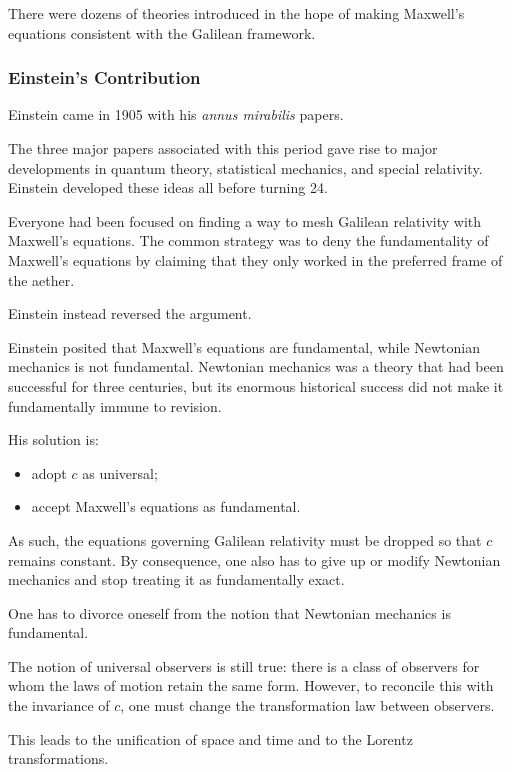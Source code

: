 		There were dozens of theories introduced in the hope of making Maxwell's equations consistent with the Galilean framework.

	\subsubsection{Einstein's Contribution}

		Einstein came in 1905 with his \textit{annus mirabilis} papers.

		The three major papers associated with this period gave rise to major developments in quantum theory, statistical mechanics, and special relativity. Einstein developed these ideas all before turning 24.

		Everyone had been focused on finding a way to mesh Galilean relativity with Maxwell's equations. The common strategy was to deny the fundamentality of Maxwell's equations by claiming that they only worked in the preferred frame of the aether.

		Einstein instead reversed the argument.

		Einstein posited that Maxwell's equations are fundamental, while Newtonian mechanics is not fundamental. Newtonian mechanics was a theory that had been successful for three centuries, but its enormous historical success did not make it fundamentally immune to revision.

		His solution is:

		\begin{itemize}
			\item adopt $c$ as universal;
			\item accept Maxwell's equations as fundamental.
		\end{itemize}

		As such, the equations governing Galilean relativity must be dropped so that $c$ remains constant. By consequence, one also has to give up or modify Newtonian mechanics and stop treating it as fundamentally exact.

		One has to divorce oneself from the notion that Newtonian mechanics is fundamental.

		The notion of universal observers is still true: there is a class of observers for whom the laws of motion retain the same form. However, to reconcile this with the invariance of $c$, one must change the transformation law between observers.

		This leads to the unification of space and time and to the Lorentz transformations.

